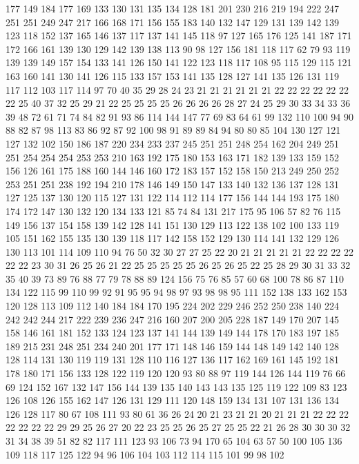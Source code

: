 177 149 184 177 169 133 130 131 135 134 128 181 201 230 216 219 194 222 247 251
251 249 247 217 166 168 171 156 155 183 140 132 147 129 131 139 142 139 123 118
152 137 165 146 137 117 137 141 145 118 97 127 165 176 125 141 187 171 172 166
161 139 130 129 142 139 138 113 90 98 127 156 181 118 117 62 79 93 119 139
139 149 157 154 133 141 126 150 141 122 123 118 117 108 95 115 129 115 121 163
160 141 130 141 126 115 133 157 153 141 135 128 127 141 135 126 131 119 117 112
103 117 114 97 70 40 35 29 28 24 23 21 21 21 21 21 21 22 22 22
22 22 22 22 25 40 37 32 25 29 21 22 25 25 25 25 26 26 26 26
28 27 24 25 29 30 33 34 33 36 39 48 72 61 71 74 84 82 91 93
86 114 144 147 77 69 83 64 61 99 132 110 100 94 90 88 82 87 98 113
83 86 92 87 92 100 98 91 89 89 84 94 80 80 85 104 130 127 121 127
132 102 150 186 187 220 234 233 237 245 251 251 248 254 162 204 249 251 251 254
254 254 253 253 210 163 192 175 180 153 163 171 182 139 133 159 152 156 126 161
175 188 160 144 146 160 172 183 157 152 158 150 213 249 250 252 253 251 251 238
192 194 210 178 146 149 150 147 133 140 132 136 137 128 131 127 125 137 130 120
115 127 131 122 114 112 114 177 156 144 144 193 175 180 174 172 147 130 132 120
134 133 121 85 74 84 131 217 175 95 106 57 82 76 115 149 156 137 154 158
139 142 128 141 151 130 129 113 122 138 102 100 133 119 105 151 162 155 135 130
139 118 117 142 158 152 129 130 114 141 132 129 126 130 113 101 114 109 110 94
76 50 32 30 27 27 25 22 20 21 21 21 21 21 22 22 22 22 22 22
23 30 31 26 25 26 21 22 25 25 25 25 25 26 25 26 25 22 25 28
29 30 31 33 32 35 40 39 73 89 76 88 77 79 78 88 89 124 156 75
76 85 57 60 68 100 78 86 87 110 134 122 115 99 110 99 92 91 95 95
94 98 97 93 98 98 95 111 152 138 133 162 153 120 128 113 109 112 140 184
184 170 195 224 202 229 246 252 250 238 140 224 242 242 244 217 222 239 236 247
216 160 207 200 205 228 187 149 170 207 145 158 146 161 181 152 133 124 123 137
141 144 139 149 144 178 170 183 197 185 189 215 231 248 251 234 240 201 177 171
148 146 159 144 148 149 142 140 128 128 114 131 130 119 119 131 128 110 116 127
136 117 162 169 161 145 192 181 178 180 171 156 133 128 122 119 120 120 93 80
88 97 119 144 126 144 119 76 66 69 124 152 167 132 147 156 144 139 135 140
143 143 135 125 119 122 109 83 123 126 108 126 155 162 147 126 131 129 111 120
148 159 134 131 107 131 136 134 126 128 117 80 67 108 111 93 80 61 36 26
24 20 21 23 21 21 20 21 21 21 22 22 22 22 22 22 22 29 29 25
26 27 20 22 23 25 25 26 25 27 25 25 22 21 26 28 30 30 30 32
31 34 38 39 51 82 82 117 111 123 93 106 73 94 170 65 104 63 57 50
100 105 136 109 118 117 125 122 94 96 106 104 103 112 114 115 101 99 98 102
